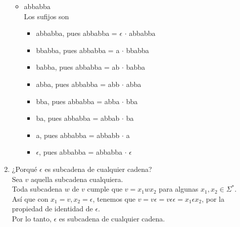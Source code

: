 \documentclass{article}
\begin{document}
\begin{enumerate}
{\begin{itemize}
            \item {
                abbabba \\
                Los sufijos son
                \begin{itemize}
                    \item {
                        abbabba, pues abbabba = $\epsilon$ $\cdot$ abbabba
                    }
                    \item {
                        bbabba, pues abbabba = a $\cdot$ bbabba
                    }
                    \item {
                        babba, pues abbabba = ab $\cdot$ babba
                    }
                    \item {
                        abba, pues abbabba = abb $\cdot$ abba
                    }
                    \item {
                        bba, pues abbabba = abba $\cdot$ bba 
                    }
                    \item {
                        ba, pues abbabba = abbab $\cdot$ ba
                    }
                    \item {
                        a, pues abbabba = abbabb $\cdot$ a 
                    }
                    \item {
                        $\epsilon$, pues abbabba = abbabba $\cdot$ $\epsilon$
                    }
                \end{itemize}
            }
        \end{itemize}
    }

    \item {
        ¿Porqué $\epsilon$ es subcadena de cualquier cadena?\\
        Sea $v$ aquella subcadena cualquiera. \\
        Toda subcadena $w$ de $v$ cumple que $v = x_1wx_2$ para algunas 
        $x_1, x_2 \in \Sigma^*$. \\
        Así que con $x_1 = v, x_2 = \epsilon$, tenemos que 
        $v = v \epsilon = v \epsilon \epsilon = x_1 \epsilon x_2$, por la propiedad de identidad de $\epsilon$.\\
        Por lo tanto, $\epsilon$ es subcadena de cualquier cadena.
    }

\end{enumerate}
    
\end{document}
